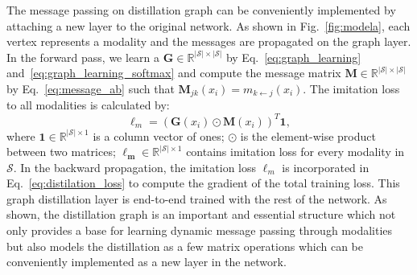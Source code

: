 The message passing on distillation graph can be conveniently implemented by attaching a new layer to the original network. As shown in Fig.~\ref{fig:modela}, each vertex represents a modality and the messages are propagated on the graph layer. In the forward pass, we learn a $\mathbf{G} \in \mathbb{R}^{|\mathcal{S}| \times |\mathcal{S}|}$ by Eq.~\eqref{eq:graph_learning} and~\eqref{eq:graph_learning_softmax} and compute the message matrix $\mathbf{M} \in \mathbb{R}^{|\mathcal{S}| \times |\mathcal{S}|}$ by Eq.~\eqref{eq:message_ab} such that $\mathbf{M}_{jk}(x_i)=m_{k \leftarrow j}(x_i)$. The imitation loss to all modalities is calculated by:
{\small
\begin{equation}
\label{eq:message_graph}
\ell_m = (\mathbf{G}(x_i) \odot \mathbf{M}(x_i))^T \mathbf{1},
\end{equation}}where $\mathbf{1} \in \mathbb{R}^{|\mathcal{S}| \times 1}$ is a column vector of ones; $\odot$ is the element-wise product between two matrices; $\mathbf{\ell_m} \in \mathbb{R}^{|\mathcal{S}| \times 1}$ contains imitation loss for every modality in $\mathcal{S}$. In the backward propagation, the imitation loss $\ell_m$ is incorporated in Eq.~\eqref{eq:distilation_loss} to compute the gradient of the total training loss. This graph distillation layer is end-to-end trained with the rest of the network. As shown, the distillation graph is an important and essential structure which not only provides a base for learning dynamic message passing through modalities but also models the distillation as a few matrix operations which can be conveniently implemented as a new layer in the network.

